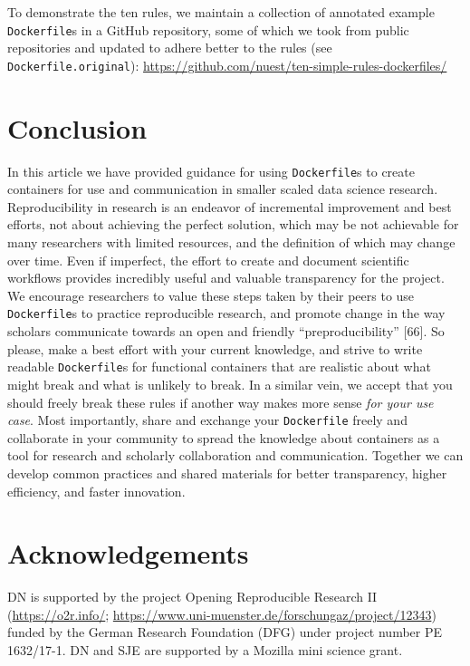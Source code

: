 \documentclass[10pt,letterpaper]{article}
\begin{document}
To demonstrate the ten rules, we maintain a collection of annotated
example \texttt{Dockerfile}s in a GitHub repository, some of which we
took from public repositories and updated to adhere better to the rules
(see \texttt{Dockerfile.original}):
\url{https://github.com/nuest/ten-simple-rules-dockerfiles/}

\hypertarget{conclusion}{%
\section*{Conclusion}\label{conclusion}}

In this article we have provided guidance for using \texttt{Dockerfile}s
to create containers for use and communication in smaller scaled data
science research. Reproducibility in research is an endeavor of
incremental improvement and best efforts, not about achieving the
perfect solution, which may be not achievable for many researchers with
limited resources, and the definition of which may change over time.
Even if imperfect, the effort to create and document scientific
workflows provides incredibly useful and valuable transparency for the
project. We encourage researchers to value these steps taken by their
peers to use \texttt{Dockerfile}s to practice reproducible research, and
promote change in the way scholars communicate towards an open and
friendly ``preproducibility'' {[}66{]}. So please, make a best effort
with your current knowledge, and strive to write readable
\texttt{Dockerfile}s for functional containers that are realistic about
what might break and what is unlikely to break. In a similar vein, we
accept that you should freely break these rules if another way makes
more sense \emph{for your use case}. Most importantly, share and
exchange your \texttt{Dockerfile} freely and collaborate in your
community to spread the knowledge about containers as a tool for
research and scholarly collaboration and communication. Together we can
develop common practices and shared materials for better transparency,
higher efficiency, and faster innovation.

\hypertarget{acknowledgements}{%
\section*{Acknowledgements}\label{acknowledgements}}

DN is supported by the project Opening Reproducible Research II
(\href{https://o2r.info/}{https://o2r.info/};
\href{https://www.uni-muenster.de/forschungaz/project/12343}{https://www.uni-muenster.de/forschungaz/project/12343})
funded by the German Research Foundation (DFG) under project number PE
1632/17-1. DN and SJE are supported by a Mozilla mini science grant.
\end{document}
